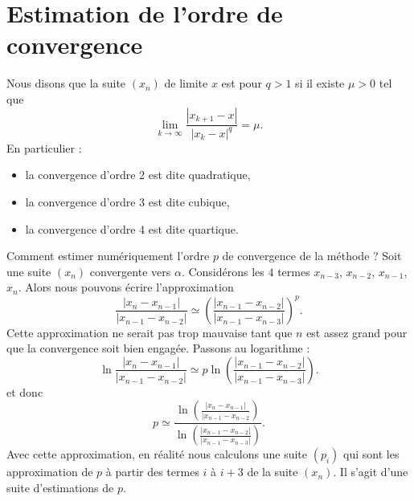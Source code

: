 
\section{Estimation de l'ordre de convergence}

\begin{definition}
    Nous disons que la suite \( (x_n)\) de limite \( x\) est  pour $q>1$ si il existe \( \mu>0\) tel que
    \begin{equation}
        \lim_{k\to \infty} \frac{ | x_{k+1}-x | }{ | x_k-x |^q }=\mu.
    \end{equation}
    En particulier :
    \begin{itemize}
        \item 
    la convergence d'ordre 2 est dite quadratique,
        \item 
    la convergence d'ordre 3 est dite cubique,
        \item 
    la convergence d'ordre 4 est dite quartique.
    \end{itemize}
\end{definition}

Comment estimer numériquement l'ordre \( p\) de convergence de la méthode ? Soit une suite \( (x_n)\) convergente vers \( \alpha\). Considérons les \( 4\) termes \( x_{n-3}\), \( x_{n-2}\), \( x_{n-1}\), \( x_n\). Alors nous pouvons écrire l'approximation
\begin{equation}
    \frac{ | x_n -x_{n-1}| }{ | x_{n-1}-x_{n-2} | }\simeq \left( \frac{ | x_{n-1}-x_{n-2} | }{ | x_{n-1}-x_{n-3} | } \right)^p.
\end{equation}
Cette approximation ne serait pas trop mauvaise tant que \( n\) est assez grand pour que la convergence soit bien engagée. Passons au logarithme :
\begin{equation}
    \ln \frac{ | x_n -x_{n-1}| }{ | x_{n-1}-x_{n-2} | }\simeq p\ln \left( \frac{ | x_{n-1}-x_{n-2} | }{ | x_{n-1}-x_{n-3} | } \right).
\end{equation}
et donc
\begin{equation}
    p\simeq \frac{ \ln\left( \frac{ | x_n -x_{n-1}| }{ | x_{n-1}-x_{n-2} } \right) }{ \ln \left(\frac{ | x_{n-1}-x_{n-2} | }{ | x_{n-1}-x_{n-3} | } \right)}.
\end{equation}
Avec cette approximation, en réalité nous calculons une suite \( (p_i)\) qui sont les approximation de \( p\) à partir des termes \( i\) à \(i+3 \) de la suite \( (x_n)\). Il s'agit d'une suite d'estimations de \( p\).

